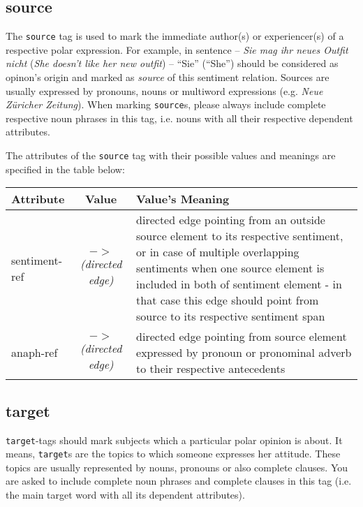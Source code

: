 \documentclass[11pt,a4paper]{article}
\begin{document}
\subsection{source}
The \texttt{source} tag is used to mark the immediate author(s) or
experiencer(s) of a respective polar expression.  For example, in
sentence -- \textit{Sie mag ihr neues Outfit nicht} (\textit{She
  doesn't like her new outfit}) -- ``Sie'' (``She'') should be
considered as opinon's origin and marked as \textit{source} of this
sentiment relation.  Sources are usually expressed by pronouns, nouns
or multiword expressions (e.g. \textit{Neue Z\"uricher Zeitung}).
When marking \texttt{source}s, please always include complete
respective noun phrases in this tag, i.e. nouns with all their
respective dependent attributes.

The attributes of the \texttt{source} tag with their possible values
and meanings are specified in the table below:\\
\begin{tabular}{|l|c|p{}|}\hline
  Attribute & Value & Value's Meaning\\\hline
  sentiment-ref & \textit{$->$\newline(directed edge)} & directed edge
  pointing from an outside source element to its respective sentiment,
  or in case of multiple overlapping sentiments when one source
  element is included in both of sentiment element - in that case this
  edge should point from source to its respective sentiment
  span\\\hline

  anaph-ref & \textit{$->$\newline(directed edge)} & directed edge
  pointing from source element expressed by pronoun or pronominal
  adverb to their respective antecedents\\\hline
\end{tabular}

\subsection{target}
\texttt{target}-tags should mark subjects which a particular polar
opinion is about.  It means, \texttt{target}s are the topics to which
someone expresses her attitude.  These topics are usually represented
by nouns, pronouns or also complete clauses.  You are asked to include
complete noun phrases and complete clauses in this tag (i.e. the main
target word with all its dependent attributes).
\end{document}
